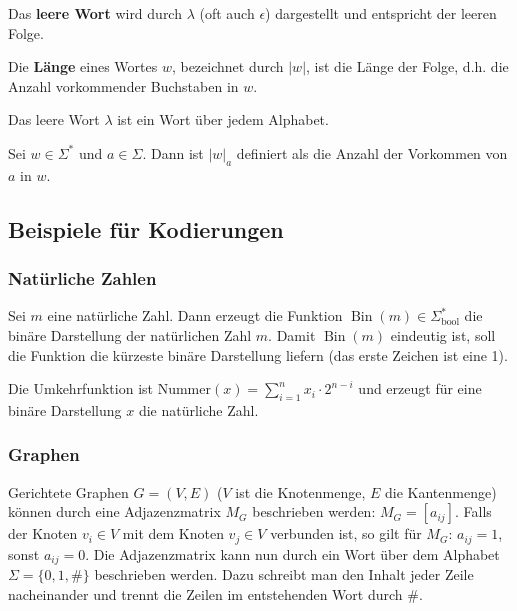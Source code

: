 \begin{definition}
Das \textbf{leere Wort} wird durch $\lambda$ (oft auch $\epsilon$) dargestellt und entspricht der leeren Folge.\\
\end{definition}

\begin{definition}
Die \textbf{Länge} eines Wortes $w$, bezeichnet durch $|w|$, ist die Länge der Folge, d.h. die Anzahl vorkommender Buchstaben in $w$.\\
\end{definition}

\begin{remark}
Das leere Wort $\lambda$ ist ein Wort über jedem Alphabet.\\
\end{remark}

\begin{definition}
Sei $w \in \Sigma^*$ und $a \in \Sigma$. Dann ist $|w|_a$ definiert als die Anzahl der Vorkommen von $a$ in $w$.
\end{definition}


\subsection{Beispiele für Kodierungen}
\subsubsection{Natürliche Zahlen}
Sei $m$ eine natürliche Zahl. Dann erzeugt die Funktion $\operatorname{Bin}(m) \in \Sigma_\text{bool}^*$ die binäre Darstellung der natürlichen Zahl $m$. Damit $\operatorname{Bin}(m)$ eindeutig ist, soll die Funktion die kürzeste binäre Darstellung liefern (das erste Zeichen ist eine 1).

Die Umkehrfunktion ist $\text{Nummer}(x) = \sum_{i = 1}^n x_i \cdot 2^{n-i}$ und erzeugt für eine binäre Darstellung $x$ die natürliche Zahl.

\subsubsection{Graphen}
Gerichtete Graphen $G = (V, E)$ ($V$ ist die Knotenmenge, $E$ die Kantenmenge) können durch eine Adjazenzmatrix $M_G$ beschrieben werden: $M_G = [a_{ij}]$. Falls der Knoten $v_i \in V$ mit dem Knoten $v_j \in V$ verbunden ist, so gilt für $M_G$: $a_{ij} = 1$, sonst $a_{ij} = 0$. Die Adjazenzmatrix kann nun durch ein Wort über dem Alphabet $\Sigma = \{0, 1, \#\}$ beschrieben werden. Dazu schreibt man den Inhalt jeder Zeile nacheinander und trennt die Zeilen im entstehenden Wort durch $\#$.

